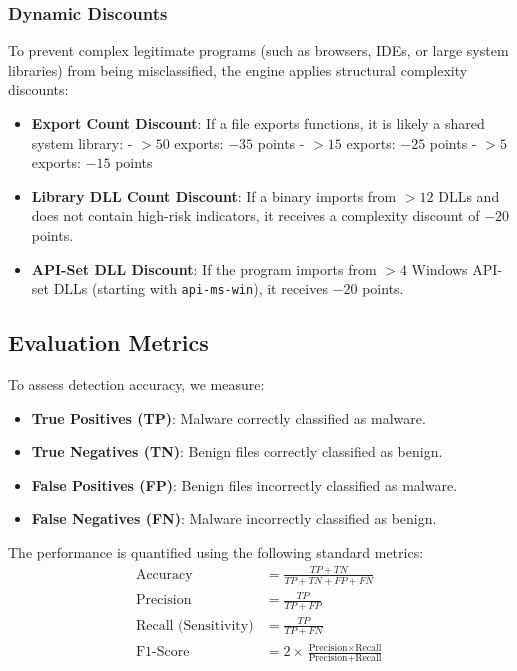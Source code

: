 \documentclass[11pt,a4paper]{article}
\begin{document}
\subsubsection{Dynamic Discounts}
To prevent complex legitimate programs (such as browsers, IDEs, or large system libraries) from being misclassified, the engine applies structural complexity discounts:
\begin{itemize}
    \item \textbf{Export Count Discount}: If a file exports functions, it is likely a shared system library:
      - $> 50$ exports: $-35$ points
      - $> 15$ exports: $-25$ points
      - $> 5$ exports: $-15$ points
    \item \textbf{Library DLL Count Discount}: If a binary imports from $>12$ DLLs and does not contain high-risk indicators, it receives a complexity discount of $-20$ points.
    \item \textbf{API-Set DLL Discount}: If the program imports from $>4$ Windows API-set DLLs (starting with \texttt{api-ms-win}), it receives $-20$ points.
\end{itemize}

\subsection{Evaluation Metrics}
To assess detection accuracy, we measure:
\begin{itemize}
    \item \textbf{True Positives (TP)}: Malware correctly classified as malware.
    \item \textbf{True Negatives (TN)}: Benign files correctly classified as benign.
    \item \textbf{False Positives (FP)}: Benign files incorrectly classified as malware.
    \item \textbf{False Negatives (FN)}: Malware incorrectly classified as benign.
\end{itemize}

The performance is quantified using the following standard metrics:
\begin{align}
    \text{Accuracy} &= \frac{TP + TN}{TP + TN + FP + FN} \\[0.5em]
    \text{Precision} &= \frac{TP}{TP + FP} \\[0.5em]
    \text{Recall (Sensitivity)} &= \frac{TP}{TP + FN} \\[0.5em]
    \text{F1-Score} &= 2 \times \frac{\text{Precision} \times \text{Recall}}{\text{Precision} + \text{Recall}}
\end{align}
\end{document}
